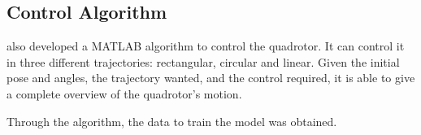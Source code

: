 
\subsection{Control Algorithm}

\citet{geronel2023} also developed a MATLAB algorithm to control the quadrotor. It can control it in three different trajectories: rectangular, circular and linear.
Given the initial pose and angles, the trajectory wanted, and the control required, it is able to give a complete overview of the quadrotor's motion.

Through the algorithm, the data to train the model was obtained.